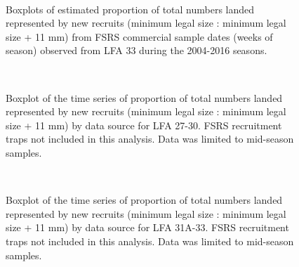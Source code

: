 \documentclass[11pt]{article}
\newcommand{\e}{/backup/bio_data/bio.lobster/figures/} %
\begin{document}
   \begin{figure}
        \centering
         \\
                     \caption{Boxplots of estimated proportion of total numbers landed represented by new recruits (minimum legal size : minimum legal size + 11 mm) from FSRS commercial sample dates (weeks of season) observed from LFA 33 during the 2004-2016 seasons.  }
        \end{figure}

\begin{figure}
        \centering
         \\
                     \caption{Boxplot of the time series of proportion of total numbers landed represented by new recruits (minimum legal size : minimum legal size + 11 mm) by data source for LFA 27-30. FSRS recruitment traps not included in this analysis. Data was limited to mid-season samples.}
        \end{figure}

\begin{figure}
        \centering
         \\
                    \caption{Boxplot of the time series of proportion of total numbers landed represented by new recruits (minimum legal size : minimum legal size + 11 mm) by data source for LFA 31A-33. FSRS recruitment traps not included in this analysis. Data was limited to mid-season samples.}
        \end{figure}
\end{document}
